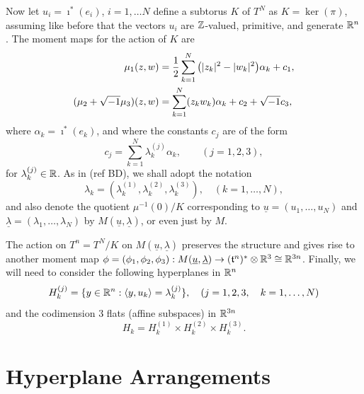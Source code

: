 Now let $u_{i} = \imath^{\ast}(e_{i})$, $i = 1,\ldots N$ define a subtorus $K$ of $T^{N}$ as $K = \ker(\pi)$, assuming like before that the vectors $u_{i}$ are $\mathbb{Z}$-valued, primitive, and generate $\mathbb{R}^{n}$. The moment maps for the action of $K$ are
\begin{equation*}
\begin{split}
	\mu_{1}(z,w) &= \frac{1}{2}\sum_{k=1}^{N}\big( |z_{k}|^{2} - |w_{k}|^{2} \big) \alpha_{k} + c_{1},\\
	(\mu_{2} + \sqrt{-1}\mu_{3} )(z,w) &= \sum_{k=1}^{N}(z_{k}w_{k})\alpha_{k} + c_{2} + \sqrt{-1}c_{3},
\end{split}
\end{equation*}
where $\alpha_{k} = \imath^{\ast}(e_{k})$, and where the constants $c_{j}$ are of the form
\begin{equation*}
	c_{j} = \sum_{k = 1}^{N}\lambda_{k}^{(j)}\alpha_{k},\qquad (j = 1,2,3),
\end{equation*}
for $\lambda_{k}^{(j)} \in \mathbb{R}$. As in (ref BD), we shall adopt the notation
\begin{equation*}
	\lambda_{k} = (\lambda_{k}^{(1)}, \lambda_{k}^{(2)}, \lambda_{k}^{(3)} ),\quad (k = 1,\ldots, N),
\end{equation*}
and also denote the \HK quotient $\mu^{-1}(0)/K$ corresponding to $\underline{u} = (u_{1}, \ldots, u_{N})$ and $\underline{\lambda} = (\lambda_{1},\ldots, \lambda_{N})$ by $M(\underline{u}, \underline{\lambda})$, or even just by $M$.

The action on $T^{n} = T^{N}/K$ on $M(\underline{u}, \underline{\lambda})$ preserves the \HK structure and gives rise to another \HK moment map $\phi = (\phi_{1}, \phi_{2}, \phi_{3}): M(\underline{u}, \underline{\lambda}) \rightarrow (\mathfrak{t}^{n})^{\ast} \otimes \mathbb{R}^{3} \cong \mathbb{R}^{3n}$. Finally, we will need to consider the following hyperplanes in $\mathbb{R}^{n}$
\begin{equation*}
	H_{k}^{(j)} = \{ y \in \mathbb{R}^{n} : \langle y, u_{k} \rangle = \lambda_{k}^{(j)} \},\quad (j = 1,2,3,\quad k = 1,\ldots, N)
\end{equation*}
and the codimension 3 flats (affine subspaces) in $\mathbb{R}^{3n}$
\begin{equation*}
	H_{k} = H_{k}^{(1)} \times H_{k}^{(2)} \times H_{k}^{(3)}.
\end{equation*}

\section{Hyperplane Arrangements}

